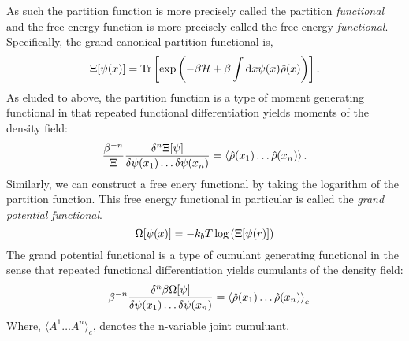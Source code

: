 As such the partition function is more precisely called the partition
\textit{functional} and the free energy function is more precisely called the
free energy \textit{functional}.  Specifically, the grand canonical partition
functional is,
%
\begin{equation}
    \Xi[\psi(x)] = \mathrm{Tr}\left[ \exp\left(-\beta\mathcal{H} +\beta\int\mathrm{d}x
        \psi(x) \hat{\rho}(x)\right) \right].
\end{equation}
%
As eluded to above, the partition function is a type of moment generating
functional in that repeated functional differentiation yields moments of the
density field:
%
\begin{equation}
    \frac{\beta^{-n}}{\Xi} \frac{\delta^n \Xi[\psi]}{\delta \psi(x_1) \dots \delta\psi(x_n)} 
        = \left\langle \hat{\rho}(x_1)\dots\hat{\rho}(x_n) \right\rangle.
\end{equation}
%
Similarly, we can construct a free enery functional by taking the logarithm of
the partition function. This free energy functional in particular is called the
\textit{grand potential functional}.
%
\begin{equation}
    \Omega[\psi(x)] = -k_bT\log\left(\Xi[\psi(r)]\right)
\end{equation}
%
The grand potential functional is a type of cumulant generating functional in
the sense that repeated functional differentiation yields cumulants of the
density field:
%
\begin{equation}
    -\beta^{-n}\frac{\delta^n\beta\Omega[\psi]}{\delta\psi(x_1)\dots\delta\psi(x_n)}
        = \left\langle \hat{\rho}(x_1)\dots\hat{\rho}(x_n) \right\rangle_c
\end{equation}
%
Where, $\langle A^1\dots A^n \rangle_c$, denotes the n-variable joint
cumuluant.

